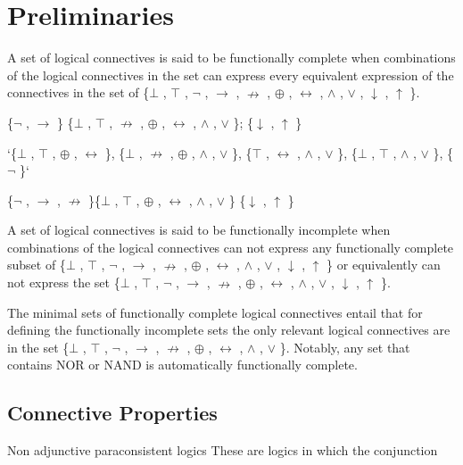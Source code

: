 \hypertarget{preliminaries}{%
\section{Preliminaries}\label{preliminaries}}

A set of logical connectives is said to be functionally complete when
combinations of the logical connectives in the set can express every
equivalent expression of the connectives in the set of \{$\bot$ , $\top$ , $\neg$ , $\to$ , $\nrightarrow$ ,
$\oplus$ , $\leftrightarrow$ , $\land$ , $\lor$ , $\downarrow$ , $\uparrow$ \}.

\{$\neg$ , $\to$ \} \{$\bot$ , $\top$ , $\nrightarrow$ , $\oplus$ , $\leftrightarrow$ , $\land$ , $\lor$ \}; \{$\downarrow$ , $\uparrow$ \}

`\{$\bot$ , $\top$ , $\oplus$ , $\leftrightarrow$ \}, \{$\bot$ , $\nrightarrow$ , $\oplus$ , $\land$ , $\lor$ \}, \{$\top$ , $\leftrightarrow$ , $\land$ , $\lor$ \}, \{$\bot$ , $\top$ , $\land$ , $\lor$ \},
\{$\neg$ \}`

\{$\neg$ , $\to$ , $\nrightarrow$ \}\{$\bot$ , $\top$ , $\oplus$ , $\leftrightarrow$ , $\land$ , $\lor$ \} \{$\downarrow$ , $\uparrow$ \}

A set of logical connectives is said to be functionally incomplete when
combinations of the logical connectives can not express any functionally
complete subset of \{$\bot$ , $\top$ , $\neg$ , $\to$ , $\nrightarrow$ , $\oplus$ , $\leftrightarrow$ , $\land$ , $\lor$ , $\downarrow$ , $\uparrow$ \} or equivalently
can not express the set \{$\bot$ , $\top$ , $\neg$ , $\to$ , $\nrightarrow$ , $\oplus$ , $\leftrightarrow$ , $\land$ , $\lor$ , $\downarrow$ , $\uparrow$ \}.

The minimal sets of functionally complete logical connectives entail
that for defining the functionally incomplete sets the only relevant
logical connectives are in the set \{$\bot$ , $\top$ , $\neg$ , $\to$ , $\nrightarrow$ , $\oplus$ , $\leftrightarrow$ , $\land$ , $\lor$ \}.
Notably, any set that contains NOR or NAND is automatically functionally
complete.

\hypertarget{connective-properties}{%
\subsection{Connective Properties}\label{connective-properties}}

Non adjunctive paraconsistent logics These are logics in which the
conjunction

